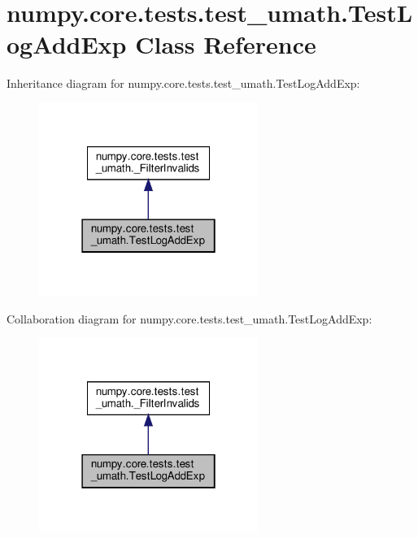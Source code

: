 \hypertarget{classnumpy_1_1core_1_1tests_1_1test__umath_1_1TestLogAddExp}{}\section{numpy.\+core.\+tests.\+test\+\_\+umath.\+Test\+Log\+Add\+Exp Class Reference}
\label{classnumpy_1_1core_1_1tests_1_1test__umath_1_1TestLogAddExp}


Inheritance diagram for numpy.\+core.\+tests.\+test\+\_\+umath.\+Test\+Log\+Add\+Exp\+:
\nopagebreak
\begin{figure}[H]
\begin{center}
\leavevmode
\includegraphics[width=202pt]{classnumpy_1_1core_1_1tests_1_1test__umath_1_1TestLogAddExp__inherit__graph}
\end{center}
\end{figure}


Collaboration diagram for numpy.\+core.\+tests.\+test\+\_\+umath.\+Test\+Log\+Add\+Exp\+:
\nopagebreak
\begin{figure}[H]
\begin{center}
\leavevmode
\includegraphics[width=202pt]{classnumpy_1_1core_1_1tests_1_1test__umath_1_1TestLogAddExp__coll__graph}
\end{center}
\end{figure}
